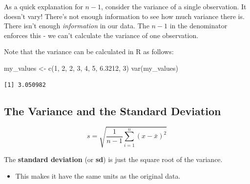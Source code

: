 \documentclass[
  letterpaper,
  DIV=11,
  numbers=noendperiod,
  oneside]{scrreprt}
\newenvironment{Shaded}{\begin{snugshade}}{\end{snugshade}}
\newcommand{\DecValTok}[1]{\textcolor[rgb]{0.68,0.00,0.00}{#1}}
\newcommand{\FloatTok}[1]{\textcolor[rgb]{0.68,0.00,0.00}{#1}}
\newcommand{\FunctionTok}[1]{\textcolor[rgb]{0.28,0.35,0.67}{#1}}
\newcommand{\NormalTok}[1]{\textcolor[rgb]{0.00,0.23,0.31}{#1}}
\newcommand{\OtherTok}[1]{\textcolor[rgb]{0.00,0.23,0.31}{#1}}
\providecommand{\tightlist}{%
  \setlength{\itemsep}{0pt}\setlength{\parskip}{0pt}}\usepackage{longtable,booktabs,array}
\begin{document}
\begin{tcolorbox}[enhanced jigsaw, toprule=.15mm, colbacktitle=quarto-callout-note-color!10!white, title=\textcolor{quarto-callout-note-color}{\faInfo}\hspace{0.5em}{\(n-1\) in the denominator}, arc=.35mm, colframe=quarto-callout-note-color-frame, colback=white, titlerule=0mm, left=2mm, bottomtitle=1mm, bottomrule=.15mm, breakable, opacitybacktitle=0.6, leftrule=.75mm, toptitle=1mm, coltitle=black, rightrule=.15mm, opacityback=0]

As a quick explanation for \(n-1\), consider the variance of a single
observation. It doesn't vary! There's not enough information to see how
much variance there is. There isn't enough \emph{information} in our
data. The \(n-1\) in the denominator enforces this - we can't calculate
the variance of one observation.

\end{tcolorbox}

Note that the variance can be calculated in R as follows:

\begin{Shaded}
\begin{Highlighting}[]
\NormalTok{my\_values }\OtherTok{\textless{}{-}} \FunctionTok{c}\NormalTok{(}\DecValTok{1}\NormalTok{, }\DecValTok{2}\NormalTok{, }\DecValTok{2}\NormalTok{, }\DecValTok{3}\NormalTok{, }\DecValTok{4}\NormalTok{, }\DecValTok{5}\NormalTok{, }\FloatTok{6.3212}\NormalTok{, }\DecValTok{3}\NormalTok{)}
\FunctionTok{var}\NormalTok{(my\_values)}
\end{Highlighting}
\end{Shaded}

\begin{verbatim}
[1] 3.050982
\end{verbatim}

\hypertarget{the-variance-and-the-standard-deviation}{%
\subsection{The Variance and the Standard
Deviation}\label{the-variance-and-the-standard-deviation}}

\[
s = \sqrt{\frac{1}{n-1}\sum_{i=1}^n(x - \bar x)^2}
\]

The \textbf{standard deviation} (or \textbf{sd}) is just the square root
of the variance.

\begin{itemize}
\tightlist
\item
  This makes it have the same units as the original data.
\end{itemize}
\end{document}
